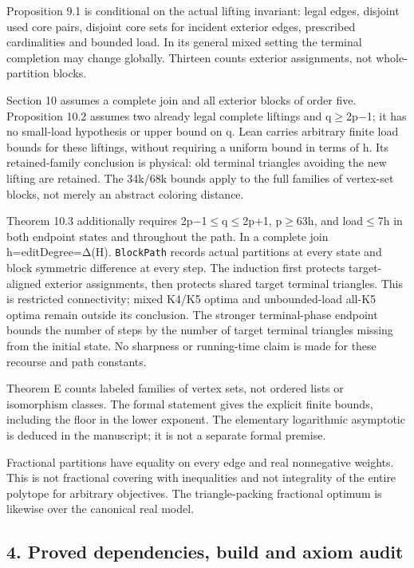 \documentclass[english,11pt,a4paper]{article}
\begin{document}
Proposition 9.1 is conditional on the actual lifting invariant: legal
edges, disjoint used core pairs, disjoint core sets for incident
exterior edges, prescribed cardinalities and bounded load. In its
general mixed setting the terminal completion may change globally.
Thirteen counts exterior assignments, not whole-partition blocks.

Section 10 assumes a complete join and all exterior blocks of order
five. Proposition 10.2 assumes two already legal complete liftings and
q\ensuremath{\ge}2p−1; it has no small-load hypothesis or upper bound on q. Lean
carries arbitrary finite load bounds for these liftings, without
requiring a uniform bound in terms of h. Its retained-family conclusion
is physical: old terminal triangles avoiding the new lifting are
retained. The 34k/68k bounds apply to the full families of vertex-set
blocks, not merely an abstract coloring distance.

Theorem 10.3 additionally requires 2p−1\ensuremath{\le}q\ensuremath{\le}2p+1, p\ensuremath{\ge}63h, and load\ensuremath{\le}7h in
both endpoint states and throughout the path. In a complete join
h=editDegree=Δ(H). \texttt{BlockPath} records actual partitions at every
state and block symmetric difference at every step. The induction first
protects target-aligned exterior assignments, then protects shared
target terminal triangles. This is restricted connectivity; mixed K4/K5
optima and unbounded-load all-K5 optima remain outside its conclusion.
The stronger terminal-phase endpoint bounds the number of steps by the
number of target terminal triangles missing from the initial state. No
sharpness or running-time claim is made for these recourse and path
constants.

Theorem E counts labeled families of vertex sets, not ordered lists or
isomorphism classes. The formal statement gives the explicit finite
bounds, including the floor in the lower exponent. The elementary
logarithmic asymptotic is deduced in the manuscript; it is not a
separate formal premise.

Fractional partitions have equality on every edge and real nonnegative
weights. This is not fractional covering with inequalities and not
integrality of the entire polytope for arbitrary objectives. The
triangle-packing fractional optimum is likewise over the canonical real
model.

\subsection{4. Proved dependencies, build and axiom
audit}\label{proved-dependencies-build-and-axiom-audit}
\end{document}
